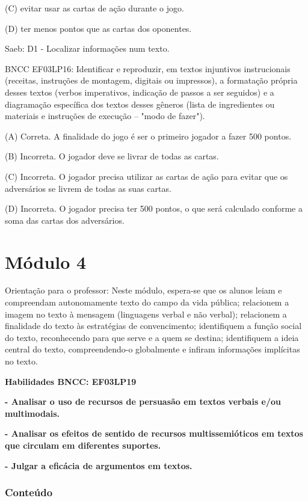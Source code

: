 \begin{itemize}
{{{\begin{itemize}
(C) evitar usar as cartas de ação durante o jogo.

(D) ter menos pontos que as cartas dos oponentes.

Saeb: D1 - Localizar informações num texto.

BNCC EF03LP16: Identificar e reproduzir, em textos injuntivos
instrucionais (receitas, instruções de montagem, digitais ou impressos),
a formatação própria desses textos (verbos imperativos, indicação de
passos a ser seguidos) e a diagramação específica dos textos desses
gêneros (lista de ingredientes ou materiais e instruções de execução --
"modo de fazer").

(A) Correta. A finalidade do jogo é ser o primeiro jogador a fazer 500
pontos.

(B) Incorreta. O jogador deve se livrar de todas as cartas.

(C) Incorreta. O jogador precisa utilizar as cartas de ação para evitar
que os adversários se livrem de todas as suas cartas.

(D) Incorreta. O jogador precisa ter 500 pontos, o que será calculado
conforme a soma das cartas dos adversários.

\chapter{Módulo 4}

Orientação para o professor: Neste módulo, espera-se que os alunos leiam
e compreendam autonomamente texto do campo da vida pública; relacionem a
imagem no texto à mensagem (linguagens verbal e não verbal); relacionem
a finalidade do texto às estratégias de convencimento; identifiquem a
função social do texto, reconhecendo para que serve e a quem se destina;
identifiquem a ideia central do texto, compreendendo-o globalmente e
infiram informações implícitas no texto.

\textbf{Habilidades BNCC: EF03LP19}


\begin{itemize}
\textbf{- Analisar o uso de recursos de persuasão em textos verbais e/ou
multimodais.}

\textbf{- Analisar os efeitos de sentido de recursos multissemióticos em
textos que circulam em diferentes suportes.}

\textbf{- Julgar a eficácia de argumentos em textos.}

\subsection{Conteúdo}\label{conteuxfado-3}


\end{itemize}
\end{itemize}}}}
\end{itemize}
